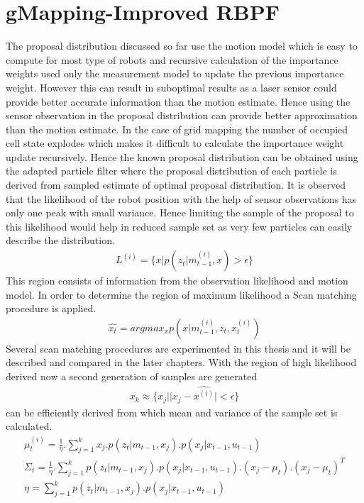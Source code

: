 \section{gMapping-Improved RBPF}
    The proposal distribution discussed so far use the motion model which is easy to compute for most type of robots and recursive calculation of the importance weights used only the
measurement model to update the previous importance weight. However this can result in suboptimal results as a laser sensor could provide better accurate information than the motion
estimate. Hence using the sensor observation in the proposal distribution can provide better approximation than the motion estimate. In the case of grid mapping the number of occupied 
cell state explodes which makes it difficult to calculate the importance weight update recursively. Hence the known proposal distribution can be obtained using the adapted particle
filter where the proposal distribution of each particle is derived from sampled estimate of optimal proposal distribution.
    It is observed that the likelihood of the robot position with the help of sensor observations has only one peak with small variance. Hence limiting the sample of the proposal
to this likelihood would help in reduced sample set as very few particles can easily describe the distribution. 
\begin{gather} \label{gMap-L}
    L^{(i)} = \{ x | p(z_t| m_{t-1}^{(i)},x)>\epsilon\} 
\end{gather}
This region consists of information from the observation likelihood and motion model. In order to determine the region of maximum likelihood a Scan 
matching procedure is applied. 
\begin{gather} \label{gMap-SM}
    \hat{x_t} = argmax_x p(x|m_{t-1}^{(i)}, z_t, x_t^{(i)})
\end{gather}
Several scan matching procedures are experimented in this thesis and it will be described and compared in the later chapters. With the region of high likelihood
derived now a second generation of samples are generated 
\begin{gather} \label{gMap-2samp}
    x_k \approx \{x_j | |x_j - \hat{x^{(i)}}|<\epsilon \}
\end{gather}
can be efficiently derived from which mean and variance of the sample set is calculated. 
\begin{gather} \label{gMap-mu}
    \mu_t^{(i)} = \frac{1}{\eta}. \sum_{j = 1}^{k}  x_j.p(z_t | m_{t-1}, x_j). p(x_j | x_{t-1}, u_{t-1}) \\
    \varSigma_t = \frac{1}{\eta}. \sum_{j = 1}^{k}  p(z_t | m_{t-1}, x_j). p(x_j | x_{t-1}, u_{t-1}).(x_j - \mu_t).(x_j - \mu_t)^T \\
    \eta = \sum_{j = 1}^{k}  p(z_t | m_{t-1}, x_j). p(x_j | x_{t-1}, u_{t-1})
\end{gather}
